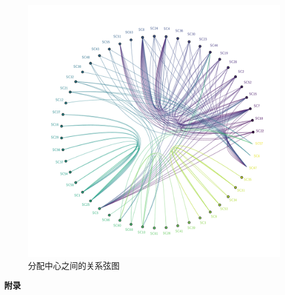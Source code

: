 \documentclass[UTF8,a4paper,10 pt]{article}%
\begin{document}
\begin{figure}[!ht]
	\centering
	\includegraphics*[width=0.8\linewidth]{images/xuantu.pdf}
	\caption{分配中心之间的关系弦图}
	\label{xt}
\end{figure}

\clearpage
\begin{center}
    \huge \bf 附录
\end{center}
\appendix
\end{document}
